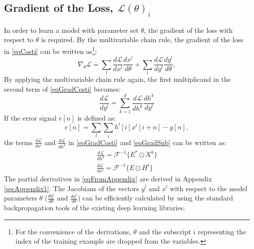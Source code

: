\documentclass[journal]{IEEEtran}
\begin{document}
\subsection{Gradient of the Loss, $\mathcal{L}(\theta)_i$}
In order to learn a model with parameter set $\theta$, the gradient of the loss with respect to $\theta$ is required. By the multivariable chain rule, the gradient of the loss in \eqref{eqCosti} can be written as\footnote{For the convenience of the derivations, $\theta$ and the subscript $i$ representing the index of the training example are dropped from the variables.}:
\begin{equation}
\label{eqGradCosti}
\nabla_\theta\mathcal{L}=\sum\limits_l\frac{d\mathcal{L}}{d x^l}\frac{d x^l}{d \theta} + \sum\limits_l\frac{d\mathcal{L}}{d y^l} \frac{d y^l}{d \theta},
\end{equation}
By applying the multivariable chain rule again, the first multiplicand in the second term of \eqref{eqGradCosti} becomes:
\begin{equation}
\label{eqGradSub}
\frac{d \mathcal{L}}{d y^l} = \sum\limits_{k=1}^d \frac{d \mathcal{L}}{d h^k} \frac{d {h^k}}{d y^l}
\end{equation}
If the error signal $e[n]$ is defined as:
\begin{equation}
\label{eqApp4}
e[n]=\sum\limits_l \sum\limits_i h^l[i]x^l[i+n]-g[n],
\end{equation}
the terms $\frac{d\mathcal{L}}{dx^l}$ and $\frac{d\mathcal{L}}{dh^k}$ in \eqref{eqGradCosti} and \eqref{eqGradSub} can be written as:
\begin{equation}
\label{eqFromAppendix}
\begin{split}
\frac{d \mathcal{L}}{d h^k}=\mathcal{F}^{-1}\{E^* \odot X^k\}
\\
\frac{d \mathcal{L}}{d x^l}=\mathcal{F}^{-1}\{E \odot H^l\}
\end{split}
\end{equation}
The partial derivatives in \eqref{eqFromAppendix} are derived in Appendix \ref{secAppendix1}. The Jacobians of the vectors $y^l$ and $x^l$ with respect to the model parameters $\theta$ ($\frac{d y^l}{d \theta}$ and $\frac{d x^l}{d \theta}$) can be efficiently calculated by using the standard backpropagation tools of the existing deep learning libraries. 
\end{document}
